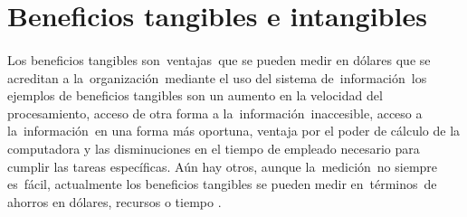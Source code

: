 %

\section{Beneficios tangibles e intangibles}
\paragraph{}
Los beneficios tangibles son ventajas que se pueden medir en dólares que se acreditan a la organización mediante el uso del sistema de información los ejemplos de beneficios tangibles son un aumento en la velocidad del procesamiento, acceso de otra forma a la información inaccesible, acceso a la información en una forma más oportuna, ventaja por el poder de cálculo de la computadora y las disminuciones en el tiempo de empleado necesario para cumplir las tareas específicas. Aún hay otros, aunque la medición no siempre es fácil, actualmente los beneficios tangibles se pueden medir en términos de ahorros en dólares, recursos o tiempo \cite{clavo_beneficios_2013}.


